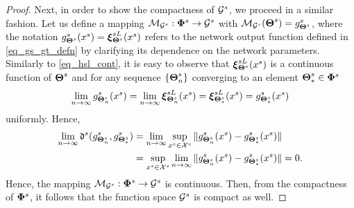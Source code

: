 \documentclass[review,supplement,onefignum,onetabnum]{siamonline250211}
\begin{document}
\begin{proof}
Next, in order to show the compactness of $\mathcal{G}^s$, we proceed in a similar fashion. Let us define a mapping $\mathcal{M}_{\mathcal{G}^s}: \mathbf{\Phi}^{s}  \rightarrow \mathcal{G}^s$ with $\mathcal{M}_{\mathcal{G}^s}(\boldsymbol{\Theta}^{s}) = g^s_{\boldsymbol{\Theta}^{s}}$, where the notation $g^s_{\boldsymbol{\Theta}^{s}}(x^s) = \boldsymbol{\xi}^{sL}_{\boldsymbol{\Theta}^{s}} (x^s)$ refers to the network output function defined in \eqref{eq_gs_gt_defn} by clarifying its dependence on the network parameters. Similarly to \eqref{eq_hsl_cont}, it is easy to observe that $\boldsymbol{\xi}^{sL}_{\boldsymbol{\Theta}^{s}} (x^s) $ is a continuous function of $\boldsymbol{\Theta}^{s}$ and for any sequence  $\{ \boldsymbol{\Theta}^{s}_n \} $ converging to an element $\boldsymbol{\Theta}^{s}_*  \in \mathbf{\Phi}^{s}$
%
\begin{equation*}
\begin{split}
\lim_{n \rightarrow \infty} g^s_{\boldsymbol{\Theta}^{s}_n}(x^s) 
    = \lim_{n \rightarrow \infty} \boldsymbol{\xi}^{sL}_{\boldsymbol{\Theta}^{s}_n} (x^s)  = \boldsymbol{\xi}^{sL}_{\boldsymbol{\Theta}^{s}_*} (x^s) 
    =g^s_{\boldsymbol{\Theta}^{s}_*}(x^s) 
\end{split}
\end{equation*}
%
uniformly. Hence,
%
\begin{equation*}
\begin{split}
\lim_{n \rightarrow \infty}  \mathfrak{d}^s(g^s_{\boldsymbol{\Theta}^{s}_n} , g^s_{\boldsymbol{\Theta}^{s}_*}   ) 
&= \lim_{n \rightarrow \infty} \sup_{x^s \in \mathcal{X}^s} 
    \|  g^s_{\boldsymbol{\Theta}^{s}_n}(x^s)  - g^s_{\boldsymbol{\Theta}^{s}_*}(x^s)  \| \\
    &=  \sup_{x^s \in \mathcal{X}^s} \lim_{n \rightarrow \infty}  \|  g^s_{\boldsymbol{\Theta}^{s}_n}(x^s)  - g^s_{\boldsymbol{\Theta}^{s}_*}(x^s)  \|
    =0.
\end{split}
\end{equation*}
%
Hence, the mapping $\mathcal{M}_{\mathcal{G}^s}: \mathbf{\Phi}^{s}  \rightarrow \mathcal{G}^s$ is continuous. Then, from the compactness of $\mathbf{\Phi}^{s} $, it follows that the function space $\mathcal{G}^s$ is compact as well.
\end{proof}
\end{document}
